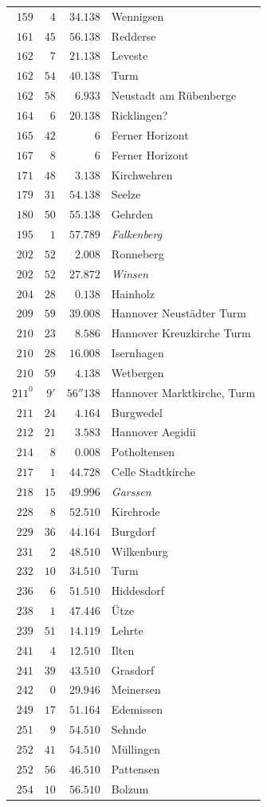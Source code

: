 \begin{longtable}{@{}rrrp{.61\linewidth}@{}}
\(159\)&\(4\)&\(34.138\)&\raggedright Wennigsen\tabularnewline
\(161\)&\(45\)&\(56.138\)&\raggedright Redderse\tabularnewline
\(162\)&\(7\)&\(21.138\)&\raggedright Leveste\tabularnewline
\(162\)&\(54\)&\(40.138\)&\raggedright Turm\tabularnewline
\(162\)&\(58\)&\(6.933\)&\raggedright Neustadt am Rübenberge\tabularnewline
\(164\)&\(6\)&\(20.138\)&\raggedright Ricklingen?\tabularnewline
\(165\)&\(42\)&\(6\)&\raggedright Ferner Horizont\tabularnewline
\(167\)&\(8\)&\(6\)&\raggedright Ferner Horizont\tabularnewline
\(171\)&\(48\)&\(3.138\)&\raggedright Kirchwehren\tabularnewline
\(179\)&\(31\)&\(54.138\)&\raggedright Seelze\tabularnewline
\(180\)&\(50\)&\(55.138\)&\raggedright Gehrden\tabularnewline
\(195\)&\(1\)&\(57.789\)&\raggedright \textit{Falkenberg}\tabularnewline
\(202\)&\(52\)&\(2.008\)&\raggedright Ronneberg\tabularnewline
\(202\)&\(52\)&\(27.872\)&\raggedright \textit{Winsen}\tabularnewline
\(204\)&\(28\)&\(0.138\)&\raggedright Hainholz\tabularnewline
\(209\)&\(59\)&\(39.008\)&\raggedright Hannover Neustädter Turm\tabularnewline
\(210\)&\(23\)&\(8.586\)&\raggedright Hannover Kreuzkirche Turm\tabularnewline
\(210\)&\(28\)&\(16.008\)&\raggedright Isernhagen\tabularnewline
\(210\)&\(59\)&\(4.138\)&\raggedright Wetbergen\tabularnewline
\(211^{0}\)&\(9'\)&\(56''138\)&\raggedright Hannover Marktkirche, Turm\tabularnewline
\(211\)&\(24\)&\(4.164\)&\raggedright Burgwedel\tabularnewline
\(212\)&\(21\)&\(3.583\)&\raggedright Hannover Aegidii\tabularnewline
\(214\)&\(8\)&\(0.008\)&\raggedright Potholtensen\tabularnewline
\(217\)&\(1\)&\(44.728\)&\raggedright Celle Stadtkirche\tabularnewline
\(218\)&\(15\)&\(49.996\)&\raggedright \textit{Garssen}\tabularnewline
\(228\)&\(8\)&\(52.510\)&\raggedright Kirchrode\tabularnewline
\(229\)&\(36\)&\(44.164\)&\raggedright Burgdorf\tabularnewline
\(231\)&\(2\)&\(48.510\)&\raggedright Wilkenburg\tabularnewline
\(232\)&\(10\)&\(34.510\)&\raggedright Turm\tabularnewline
\(236\)&\(6\)&\(51.510\)&\raggedright Hiddesdorf\tabularnewline
\(238\)&\(1\)&\(47.446\)&\raggedright Ütze\tabularnewline
\(239\)&\(51\)&\(14.119\)&\raggedright Lehrte\tabularnewline
\(241\)&\(4\)&\(12.510\)&\raggedright Ilten\tabularnewline
\(241\)&\(39\)&\(43.510\)&\raggedright Grasdorf\tabularnewline
\(242\)&\(0\)&\(29.946\)&\raggedright Meinersen\tabularnewline
\(249\)&\(17\)&\(51.164\)&\raggedright Edemissen\tabularnewline
\(251\)&\(9\)&\(54.510\)&\raggedright Sehnde\tabularnewline
\(252\)&\(41\)&\(54.510\)&\raggedright Müllingen\tabularnewline
\(252\)&\(56\)&\(46.510\)&\raggedright Pattensen\tabularnewline
\(254\)&\(10\)&\(56.510\)&\raggedright Bolzum\tabularnewline

\end{longtable}
